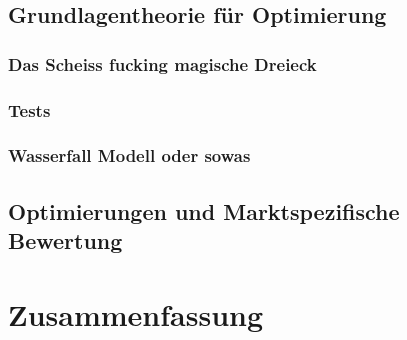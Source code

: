 \section{Grundlagentheorie für Optimierung}

\subsection{Das Scheiss fucking magische Dreieck}

\subsection{Tests}

\subsection{Wasserfall Modell oder sowas}

\section{Optimierungen und Marktspezifische Bewertung}

\chapter{Zusammenfassung}